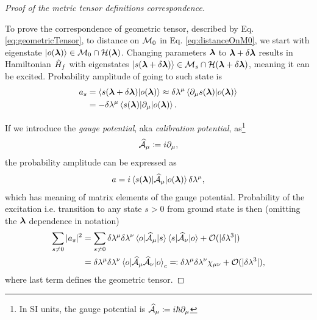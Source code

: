 \begin{proof}[Proof of the  metric tensor definitions correspondence]\
    \label{sec:derivationOfGeometricTensor}

    To prove the correspondence of geometric tensor, described by Eq. \ref{eq:geometricTensor}, to distance on $\M_0$ in Eq. \ref{eq:distanceOnM0}, we start with eigenstate $\ket{o(\llambda)}\in \M_0\cap \H(\llambda)$. Changing parameters $\llambda$ to $\llambda+\delta \llambda$ results in Hamiltonian $\HH_f$ with eigenstates $\ket{s(\llambda+\delta \llambda)}\in \M_s\cap\H(\llambda+\delta \llambda)$, meaning it can be excited. Probability amplitude of going to such state is
    \begin{equation}
        \begin{split}
            a_s&=\braket{s(\llambda+\delta\llambda)|o(\llambda)}\approx \delta\lambda^\mu\braket{\partial_\mu s(\llambda)|o(\llambda)} \\
            &= -\delta\lambda^\mu\braket{s(\llambda)|\partial_\mu|o(\llambda)}.
        \end{split}
    \end{equation}

    If we introduce the \emph{gauge potential}, aka \emph{calibration potential}, as\footnote{In SI units, the gauge potential is $\AA_\mu\coloneqq i\hbar\partial_{\mu}$}
    \begin{equation}
        \AA_\mu\coloneqq i\partial_{\mu},
    \end{equation}
    the probability amplitude can be expressed as
    \begin{equation}
    a=i\braket{s(\llambda)|\AA_\mu |o(\llambda)}\delta\lambda^\mu,
    \label{eq:probabilityOfTransitionIsGauge}
    \end{equation}
    which has meaning of matrix elements of the gauge potential. Probability of the excitation i.e. transition to any state $s>0$ from ground state is then (omitting the $\llambda$ dependence in notation)
    \begin{equation}
        \begin{split}
            \sum_{s\neq 0}|a_s|^2&=  \sum_{s\neq 0} \delta \lambda^\mu \delta \lambda^\nu\braket{o|\AA_\mu|s}\braket{s|\AA_\nu|o}+\O(|\delta \lambda^3|) \\
            &= \delta \lambda^\mu \delta \lambda^\nu\braket{o|\AA_\mu \AA_\nu|o}_c\eqqcolon \delta \lambda^\mu \delta \lambda^\nu\chi_{\mu\nu}+\O(|\delta \lambda^3|),
        \end{split}
    \end{equation}
    where last term defines the geometric tensor.
\end{proof}







